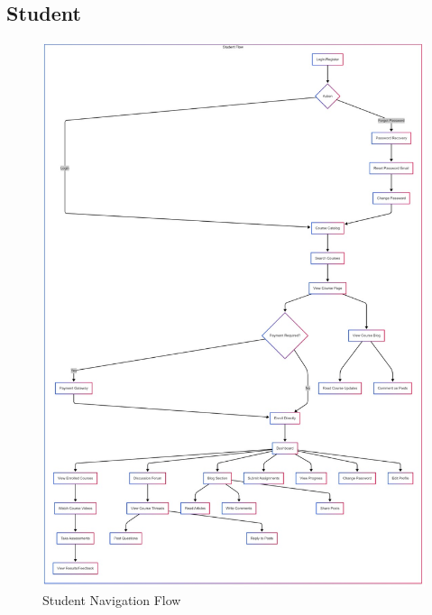 \documentclass[a4paper, 11pt]{scrreprt}
\begin{document}
\subsection{Student}
\begin{figure}[!htb]
    \centering
    \includegraphics[height=0.63\textheight]{UI/stuFlow.jpg}
    \caption{Student Navigation Flow}
\end{figure}
\end{document}
